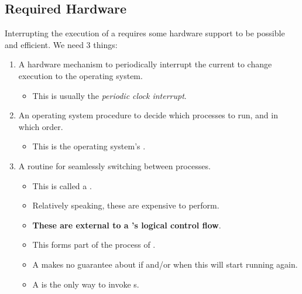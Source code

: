 \subsection{Required Hardware}\label{subsec:Required_Hardware}
Interrupting the execution of a  requires some hardware support to be possible and efficient.
We need 3 things:
\begin{enumerate}[noitemsep]
\item A hardware mechanism to periodically interrupt the current  to change execution to the operating system.
  \begin{itemize}[noitemsep]
  \item This is usually the \emph{periodic clock interrupt}.
  \end{itemize}
\item An operating system procedure to decide which processes to run, and in which order.
  \begin{itemize}[noitemsep]
  \item This is the operating system's .
  \end{itemize}
\item A routine for seamlessly switching between processes.
  \begin{itemize}[noitemsep]
  \item This is called a .
  \item Relatively speaking, these are expensive to perform.
  \item \textbf{These are external to a 's logical control flow}.
  \item This forms part of the process of .
  \item A  makes no guarantee about if and/or when this  will start running again.
  \item A  is the only way to invoke s.
  \end{itemize}
\end{enumerate}


